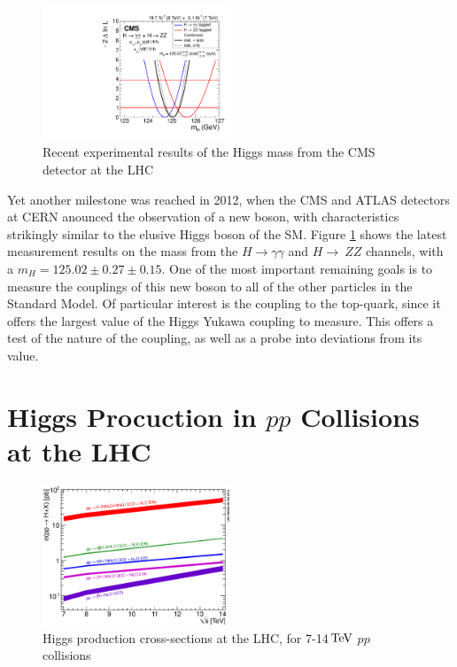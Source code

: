 \begin{figure}[h]
   \centering
  \includegraphics[width=0.5\textwidth]{Figures/Experimental_Results/CMS_higgsMass_scan_1d_all.pdf}
  \caption{Recent experimental results of the Higgs mass from the CMS detector at the LHC} \label{fig:topMass_CDF}
\end{figure}

\par Yet another milestone was reached in 2012, when the CMS and ATLAS
detectors at CERN anounced the observation of a new boson, with
characteristics strikingly similar to the elusive Higgs boson of the
SM.  Figure \ref{fig:topMass_CDF} shows the latest measurement results
on the mass from the $H\rightarrow\gamma\gamma$ and $H\rightarrow~ZZ$
channels, with a $m_{H} = 125.02 \pm 0.27 \pm 0.15$.  One of the most
important remaining goals is to measure the couplings of this new
boson to all of the other particles in the Standard Model.  Of
particular interest is the coupling to the top-quark, since it offers
the largest value of the Higgs Yukawa coupling to measure.  This
offers a test of the nature of the coupling, as well as a probe into
deviations from its value.  


\section{Higgs Procuction in $pp$ Collisions at the LHC}
\label{higgs_production_overview}

\begin{figure}[h]
   \centering
  \includegraphics[width=0.5\textwidth]{Figures/Experimental_Results/Higgs_XS_7-14TeV.eps}
  \caption{Higgs production cross-sections at the LHC, for 7-14$\,\text{Te\hspace{-.08em}V}$
    $pp$ collisions} \label{fig:Higgs_XS_7-14TeV}
\end{figure}

